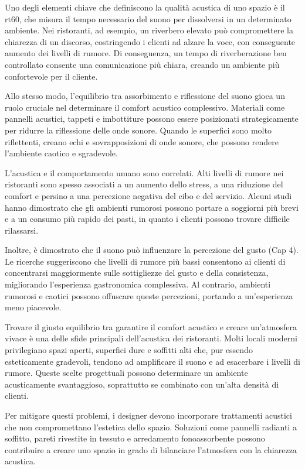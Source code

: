 Uno degli elementi chiave che definiscono la qualità acustica di uno spazio è il \gls{rt60}, che misura il tempo necessario del suono per dissolversi in un determinato ambiente. Nei ristoranti, ad esempio, un riverbero elevato può compromettere la chiarezza di un discorso, costringendo i clienti ad alzare la voce, con conseguente aumento dei livelli di rumore. Di conseguenza, un tempo di riverberazione ben controllato consente una comunicazione più chiara, creando un ambiente più confortevole per il cliente.

Allo stesso modo, l'equilibrio tra assorbimento e riflessione del suono gioca un ruolo cruciale nel determinare il comfort acustico complessivo. Materiali come pannelli acustici, tappeti e imbottiture possono essere posizionati strategicamente per ridurre la riflessione delle onde sonore. Quando le superfici sono molto riflettenti, creano echi e sovrapposizioni di onde sonore, che possono rendere l'ambiente caotico e sgradevole.

L'acustica e il comportamento umano sono correlati. Alti livelli di rumore nei ristoranti sono spesso associati a un aumento dello stress, a una riduzione del comfort e persino a una percezione negativa del cibo e del servizio. Alcuni studi hanno dimostrato che gli ambienti rumorosi possono portare a soggiorni più brevi e a un consumo più rapido dei pasti, in quanto i clienti possono trovare difficile rilassarsi.

Inoltre, è dimostrato che il suono può influenzare la percezione del gusto (Cap 4). Le ricerche suggeriscono che livelli di rumore più bassi consentono ai clienti di concentrarsi maggiormente sulle sottigliezze del gusto e della consistenza, migliorando l'esperienza gastronomica complessiva. Al contrario, ambienti rumorosi e caotici possono offuscare queste percezioni, portando a un'esperienza meno piacevole.

Trovare il giusto equilibrio tra garantire il comfort acustico e creare un'atmosfera vivace è una delle sfide principali dell'acustica dei ristoranti. Molti locali moderni privilegiano spazi aperti, superfici dure e soffitti alti che, pur essendo esteticamente gradevoli, tendono ad amplificare il suono e ad esacerbare i livelli di rumore. Queste scelte progettuali possono determinare un ambiente acusticamente svantaggioso, soprattutto se combinato con un'alta densità di clienti.

Per mitigare questi problemi, i designer devono incorporare trattamenti acustici che non compromettano l'estetica dello spazio. Soluzioni come pannelli radianti a soffitto, pareti rivestite in tessuto e arredamento fonoassorbente possono contribuire a creare uno spazio in grado di bilanciare l'atmosfera con la chiarezza acustica. \cite{wiki:sound-restaurants}


